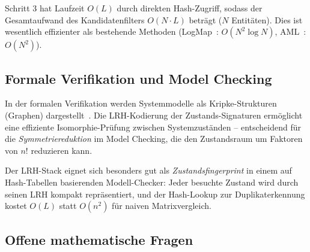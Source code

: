 ﻿\documentclass[a4paper,12pt]{article}
\theoremstyle{definition}
\begin{document}
Schritt 3 hat Laufzeit $O(L)$ durch direkten Hash-Zugriff, sodass der Gesamtaufwand
des Kandidatenfilters $O(N \cdot L)$ beträgt ($N$ Entitäten). Dies ist wesentlich
effizienter als bestehende Methoden (LogMap~\cite{jimenez2011}: $O(N^2 \log N)$,
AML~\cite{faria2013}: $O(N^2)$).

\subsection{Formale Verifikation und Model Checking}

In der formalen Verifikation werden Systemmodelle als Kripke-Strukturen (Graphen)
dargestellt~\cite{baier2008}. Die LRH-Kodierung der Zustands-Signaturen ermöglicht
eine effiziente Isomorphie-Prüfung zwischen Systemzuständen -- entscheidend für
die \emph{Symmetriereduktion} im Model Checking, die den Zustandsraum um Faktoren
von $n!$ reduzieren kann.

Der LRH-Stack eignet sich besonders gut als \emph{Zustandsfingerprint} in einem
auf Hash-Tabellen basierenden Modell-Checker: Jeder besuchte Zustand wird durch
seinen LRH kompakt repräsentiert, und der Hash-Lookup zur Duplikaterkennung
kostet $O(L)$ statt $O(n^2)$ für naiven Matrixvergleich.

\subsection{Offene mathematische Fragen}
\end{document}
